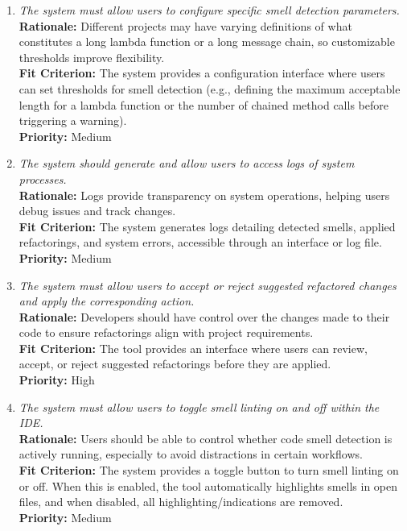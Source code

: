 \documentclass[12pt]{article}
\begin{document}
\begin{enumerate}[label=FR \arabic*., wide=0pt, leftmargin=*]
  \item \emph{The system must allow users to configure specific smell
    detection parameters.}\\[2mm]
    {\bf Rationale:} Different projects may have varying definitions
    of what constitutes a long lambda function or a long message
    chain, so customizable thresholds improve flexibility.\\
    {\bf Fit Criterion:} The system provides a configuration
    interface where users can set thresholds for smell detection
    (e.g., defining the maximum acceptable length for a lambda
      function or the number of chained method calls before triggering
    a warning).\\
    {\bf Priority:} Medium

  \item \emph{The system should generate and allow users to access
    logs of system processes.}\\[2mm]
    {\bf Rationale:} Logs provide transparency on system operations,
    helping users debug issues and track changes.\\
    {\bf Fit Criterion:} The system generates logs detailing detected
    smells, applied refactorings, and system errors, accessible
    through an interface or log file.\\
    {\bf Priority:} Medium

  \item \emph{The system must allow users to accept or reject
    suggested refactored changes and apply the corresponding action.}\\[2mm]
    {\bf Rationale:} Developers should have control over the changes
    made to their code to ensure refactorings align with project requirements.\\
    {\bf Fit Criterion:} The tool provides an interface where users
    can review, accept, or reject suggested refactorings before they
    are applied.\\
    {\bf Priority:} High

  \item \emph{The system must allow users to toggle smell linting on
    and off within the IDE.}\\[2mm]
    {\bf Rationale:} Users should be able to control whether code
    smell detection is actively running, especially to avoid
    distractions in certain workflows.\\
    {\bf Fit Criterion:} The system provides a toggle button to turn
    smell linting on or off. When this is enabled, the tool
    automatically highlights smells in open files, and when disabled,
    all highlighting/indications are removed.\\
    {\bf Priority:} Medium


\end{enumerate}
\end{document}
